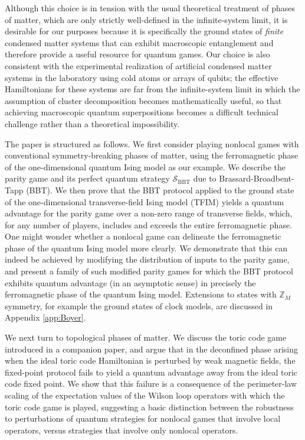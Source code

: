 \documentclass[prb,twocolumn,showpacs,amssymb,superscriptaddress]{revtex4-2}
\begin{document}
Although this choice is in tension with the usual theoretical treatment of phases of matter, which are only strictly well-defined in the infinite-system limit, it is desirable for our purposes because it is specifically the ground states of \emph{finite} condensed matter systems that can exhibit macroscopic entanglement and therefore provide a useful resource for quantum games. Our choice is also consistent with the experimental realization of artificial condensed matter systems in the laboratory using cold atoms or arrays of qubits; the effective Hamiltonians for these systems are far from the infinite-system limit in which the assumption of cluster decomposition becomes mathematically useful, so that achieving macroscopic quantum superpositions becomes a difficult technical challenge rather than a theoretical impossibility\cite{Lukin,Song}.

The paper is structured as follows.  We first consider playing nonlocal games with conventional symmetry-breaking phases of matter, using the ferromagnetic phase of the one-dimensional quantum Ising model as our example. We describe the parity game and its perfect quantum strategy $\mathcal{S}_{\mathrm{BBT}}$ due to Brassard-Broadbent-Tapp (BBT)\cite{Brassard2005}. We then prove that the BBT protocol applied to the ground state of the one-dimensional transverse-field Ising model (TFIM) yields a quantum advantage for the parity game over a  non-zero range of transverse fields, which, for any number of players, includes and exceeds the entire ferromagnetic phase. One might wonder whether a nonlocal game can delineate the ferromagnetic phase of the quantum Ising model more clearly. We demonstrate that this can indeed be achieved by modifying the distribution of inputs to the parity game, and present a family of such modified parity games for which the BBT protocol exhibits quantum advantage (in an asymptotic sense) in precisely the ferromagnetic phase of the quantum Ising model. Extensions to states with $\mathbb{Z}_M$ symmetry, for example the ground states of clock models, are discussed in Appendix \ref{app:Boyer}.

We next turn to topological phases of matter. We discuss the toric code game introduced in a companion paper\cite{companion}, and argue that in the deconfined phase arising when the ideal toric code Hamiltonian is perturbed by weak magnetic fields\cite{KITAEV20032,Tupitsyn_2010}, the fixed-point protocol fails to yield a quantum advantage away from the ideal toric code fixed point. We show that this failure is a consequence of the perimeter-law scaling of the expectation values of the Wilson loop operators with which the toric code game is played\cite{companion}, suggesting a basic distinction between the robustness to perturbations of quantum strategies for nonlocal games that involve local operators, versus strategies that involve only nonlocal operators.
\end{document}
